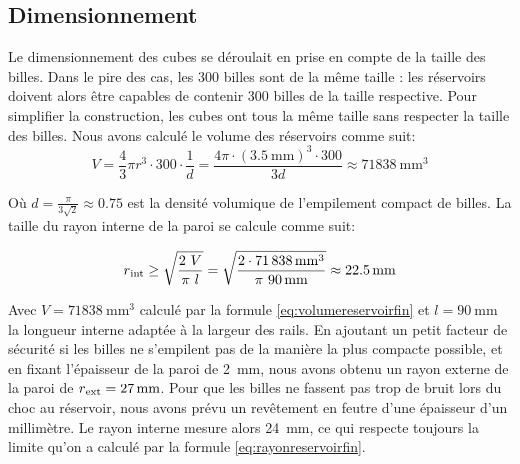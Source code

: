 \subsection{Dimensionnement}
Le dimensionnement des cubes se déroulait en prise en compte de la taille des billes. Dans le pire des cas, les \num{300} billes sont de la même taille : les réservoirs doivent alors être capables de contenir \num{300} billes de la taille respective. Pour simplifier la construction, les cubes ont tous la même taille sans respecter la taille des billes.
Nous avons calculé le volume des réservoirs comme suit:
\begin{equation}
    V = \frac{4}{3} \pi r^3 \cdot \num{300} \cdot \frac{1}{d} = \frac{4 \pi \cdot (\SI{3.5}{\mm})^3 \cdot \num{300}}{3 d} \approx \SI{71838}{\mm\cubed}
    \label{eq:volumereservoirfin}
\end{equation}

Où \(d = \frac{\pi}{3\sqrt{2}} \approx \num{0.75}\) est la densité volumique de l'empilement compact de billes.
La taille du rayon interne de la paroi se calcule comme suit:

\begin{equation}r\textsubscript{int} \geq \sqrt{\frac{2\ V}{\pi\ l}}=\sqrt{\frac{2 \cdot \SI{71838}{\mm\cubed}}{\pi\ \SI{90}{\mm}}} \approx \SI{22.5}{\mm} \label{eq:rayonreservoirfin}\end{equation}

Avec $V= \SI{71838}{\mm\cubed}$ calculé par la formule \ref{eq:volumereservoirfin} et $l=\SI{90}{\mm}$ la longueur interne adaptée à la largeur des rails. En ajoutant un petit facteur de sécurité si les billes ne s'empilent pas de la manière la plus compacte possible, et en fixant l'épaisseur de la paroi de \SI{2}{\mm}, nous avons obtenu un rayon externe de la paroi de $r\textsubscript{ext}=\SI{27}{\mm}$. Pour que les billes ne fassent pas trop de bruit lors du choc au réservoir, nous avons prévu un revêtement en feutre d'une épaisseur d'un millimètre. Le rayon interne mesure alors \SI{24}{\mm}, ce qui respecte toujours la limite qu'on a calculé par la formule \ref{eq:rayonreservoirfin}.
